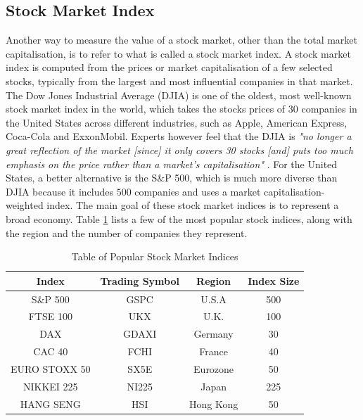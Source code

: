 \documentclass{UoYCSproject}
\begin{document}
\subsection{Stock Market Index}
Another way to measure the value of a stock market, other than the total market capitalisation, is to refer to what is called a stock market index. A stock market index is computed from the prices or market capitalisation of a few selected stocks, typically from the largest and most influential companies in that market. The Dow Jones Industrial Average (DJIA) is one of the oldest, most well-known stock market index in the world, which takes the stocks prices of 30 companies in the United States across different industries, such as Apple, American Express, Coca-Cola and ExxonMobil. Experts however feel that the DJIA is \textit{"no longer a great reflection of the market [since] it only covers 30 stocks [and] puts too much emphasis on the price rather than a market's capitalisation"} \cite{dowproblem}. For the United States, a better alternative is the S\&P 500, which is much more diverse than DJIA because it includes $500$ companies and uses a market capitalisation-weighted index. The main goal of these stock market indices is to represent a broad economy. Table \ref{tab:indices} lists a few of the most popular stock indices, along with the region and the number of companies they represent. 

\begin{table}[h]
    \centering
    \begin{tabular}{|c|c|c|c|} \hline
        \textbf{Index} & \textbf{Trading Symbol} & \textbf{Region} & \textbf{Index Size} \\ \hline
        S\&P 500 & GSPC & U.S.A & 500 \\
        FTSE 100 & UKX & U.K. & 100 \\
        DAX & GDAXI & Germany & 30 \\
        CAC 40 & FCHI & France & 40 \\
        EURO STOXX 50 & SX5E & Eurozone & 50 \\
        NIKKEI 225 & NI225 & Japan & 225 \\
        HANG SENG & HSI & Hong Kong & 50 \\
        \hline
    \end{tabular}
    \caption{Table of Popular Stock Market Indices}
    \label{tab:indices}
\end{table}
\end{document}

